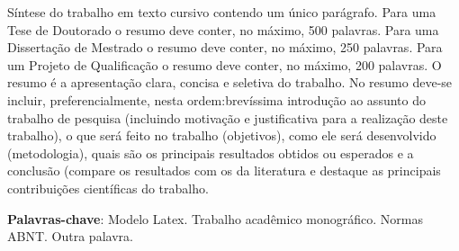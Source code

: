 
%
%

\begin{resumo}
    Síntese do trabalho em texto cursivo contendo um único parágrafo. Para uma
    Tese de Doutorado o resumo deve conter, no máximo, 500 palavras. Para uma
    Dissertação de Mestrado o resumo deve conter, no máximo, 250 palavras. Para
    um Projeto de Qualificação o resumo deve conter, no máximo, 200 palavras. O
    resumo é a apresentação clara, concisa e seletiva do trabalho. No resumo 
    deve-se incluir, preferencialmente, nesta ordem:brevíssima introdução ao
    assunto do trabalho de pesquisa (incluindo motivação e justificativa para a
    realização deste trabalho), o que será feito no trabalho (objetivos), como
    ele será desenvolvido (metodologia), quais são os principais resultados
    obtidos ou esperados e a conclusão (compare os resultados com os da
    literatura e destaque as principais contribuições científicas do trabalho.

    \textbf{Palavras-chave}: Modelo Latex. Trabalho acadêmico monográfico.
    Normas ABNT. Outra palavra.
\end{resumo}
